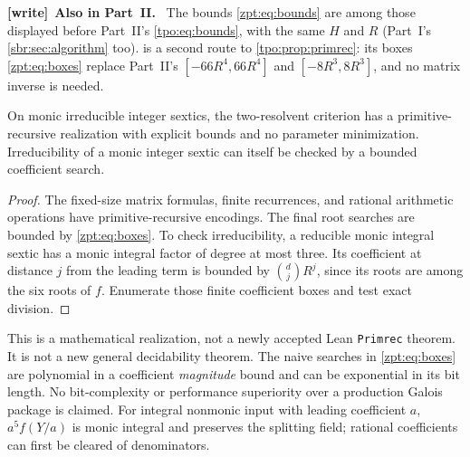 \documentclass[11pt,letterpaper]{article}
\numberwithin{equation}{section}
\theoremstyle{definition}
\theoremstyle{remark}
\newcommand{\code}[1]{\texttt{\small #1}}
\newenvironment{writenote}[1][]{\par\smallskip\begingroup\small
 \noindent\textbf{[write]}\if\relax\detokenize{#1}\relax\else~\textbf{#1.}\fi\ }%
 {\par\endgroup\smallskip}
\begin{document}
\begin{writenote}[Also in Part~II]
The bounds \eqref{zpt:eq:bounds} are among those displayed before
Part~II's \eqref{tpo:eq:bounds}, with the same $H$ and $R$ (Part~I's
\cref{sbr:sec:algorithm} too).  is a second route to
\cref{tpo:prop:primrec}: its boxes \eqref{zpt:eq:boxes} replace Part~II's
$[-66R^4,66R^4]$ and $[-8R^3,8R^3]$, and no matrix inverse is needed.
\end{writenote}

\begin{proposition}
\label{zpt:prop:bounded}
On monic irreducible integer sextics, the two-resolvent criterion has a
primitive-recursive realization with explicit bounds and no parameter
minimization. Irreducibility of a monic integer sextic can itself be checked
by a bounded coefficient search.
\end{proposition}
\begin{proof}
The fixed-size matrix formulas, finite recurrences, and rational
arithmetic operations have primitive-recursive encodings. The final root
searches are bounded by \eqref{zpt:eq:boxes}. To check irreducibility, a
reducible monic integral sextic has a monic integral factor of degree at
most three. Its coefficient at distance $j$ from the leading term is
bounded by $\binom djR^j$, since its roots are among the six roots of $f$.
Enumerate those finite coefficient boxes and test exact division.
\end{proof}
This is a mathematical realization, not a newly accepted Lean
\code{Primrec} theorem. It is not a new general decidability theorem.
The naive searches in \eqref{zpt:eq:boxes} are polynomial in a coefficient
\emph{magnitude} bound and can be exponential in its bit length. No
bit-complexity or performance superiority over a production Galois package
is claimed. For integral nonmonic input with leading coefficient $a$,
$a^5f(Y/a)$ is monic integral and preserves the splitting field; rational
coefficients can first be cleared of denominators.
\end{document}
